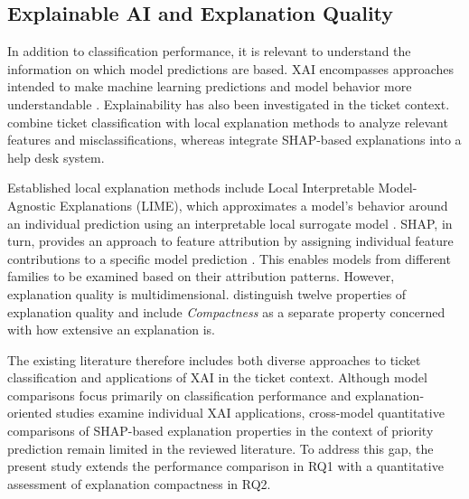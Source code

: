 \subsection{Explainable AI and Explanation Quality}

In addition to classification performance, it is relevant to understand the information on which model predictions are based. XAI encompasses approaches intended to make machine learning predictions and model behavior more understandable \cite{guidotti2018survey,arrieta2020xai,adadi2018peeking}. Explainability has also been investigated in the ticket context. \citet{zicari2022ticket} combine ticket classification with local explanation methods to analyze relevant features and misclassifications, whereas \citet{licina2026helpagent} integrate SHAP-based explanations into a help desk system.

Established local explanation methods include Local Interpretable Model-Agnostic Explanations (LIME), which approximates a model's behavior around an individual prediction using an interpretable local surrogate model \cite{ribeiro2016lime}. SHAP, in turn, provides an approach to feature attribution by assigning individual feature contributions to a specific model prediction \cite{lundberg2017shap}. This enables models from different families to be examined based on their attribution patterns. However, explanation quality is multidimensional. \citet{nauta2023evaluation} distinguish twelve properties of explanation quality and include \emph{Compactness} as a separate property concerned with how extensive an
explanation is.

The existing literature therefore includes both diverse approaches to ticket classification and applications of XAI in the ticket context. Although model comparisons focus primarily on classification performance and explanation-oriented studies examine individual XAI applications, cross-model quantitative comparisons of SHAP-based explanation properties in the context of priority prediction remain limited in the reviewed literature. To address this gap, the present study extends the performance comparison in RQ1 with a quantitative assessment of explanation compactness in RQ2.